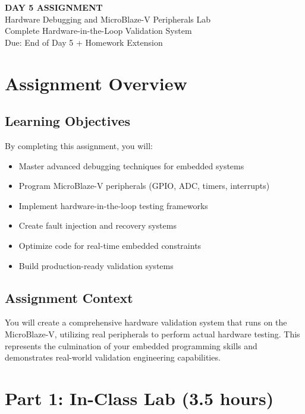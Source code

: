\documentclass[11pt,a4paper]{article}
\begin{document}
\begin{center}
    {\Huge\bfseries\color{codeblue} DAY 5 ASSIGNMENT}\\[0.5cm]
    {\Large Hardware Debugging and MicroBlaze-V Peripherals Lab}\\[0.3cm]
    {\large Complete Hardware-in-the-Loop Validation System}\\[0.2cm]
    {\normalsize Due: End of Day 5 + Homework Extension}
\end{center}

\vspace{1cm}

\section{Assignment Overview}

\subsection{Learning Objectives}
By completing this assignment, you will:
\begin{itemize}
    \item Master advanced debugging techniques for embedded systems
    \item Program MicroBlaze-V peripherals (GPIO, ADC, timers, interrupts)
    \item Implement hardware-in-the-loop testing frameworks
    \item Create fault injection and recovery systems
    \item Optimize code for real-time embedded constraints
    \item Build production-ready validation systems
\end{itemize}

\subsection{Assignment Context}
You will create a comprehensive hardware validation system that runs on the MicroBlaze-V, utilizing real peripherals to perform actual hardware testing. This represents the culmination of your embedded programming skills and demonstrates real-world validation engineering capabilities.

\section{Part 1: In-Class Lab (3.5 hours)}
\end{document}
